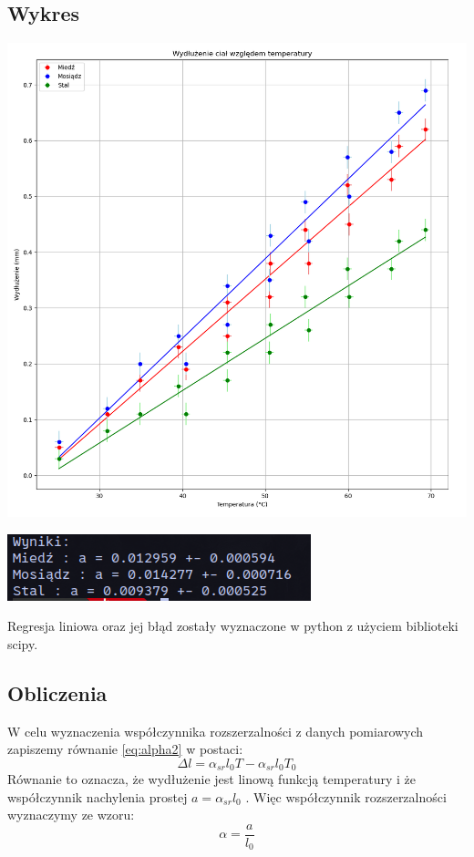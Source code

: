 \documentclass[a4paper, 11pt]{article}
\begin{document}
\subsection{Wykres}\label{sub:wykres} %
\begin{center}
	\includegraphics[scale=0.3]{images/wykres2.png}

	\includegraphics[scale=0.7]{images/wyniki.png}
\end{center}

Regresja liniowa oraz jej błąd zostały wyznaczone w python z użyciem biblioteki scipy.


\subsection{Obliczenia}\label{sub:obliczenia} %
W celu wyznaczenia współczynnika rozszerzalności z danych pomiarowych zapiszemy równanie \eqref{eq:alpha2} w postaci:
\begin{equation}
	\Delta l = \alpha_{sr} l_0 T - \alpha_{sr} l_0 T_0
\end{equation}
Równanie to oznacza, że wydłużenie jest linową funkcją temperatury i że współczynnik nachylenia prostej
$a = \alpha_{sr}l_0$ . Więc współczynnik rozszerzalności wyznaczymy ze wzoru:
\begin{equation}
	\alpha = \frac{a}{l_0}
\end{equation}
\end{document}
